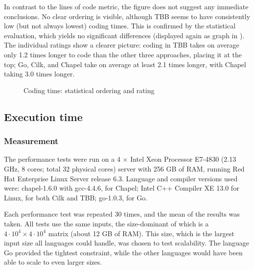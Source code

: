 In contrast to the lines of code metric, the figure does not suggest any immediate conclusions. No clear ordering is visible, although TBB seems to have consistently low (but not always lowest) coding times. This is confirmed by the statistical evaluation, which yields no significant differences (displayed again as graph in ). The individual ratings show a clearer picture: coding in TBB takes on average only 1.2 times longer to code than the other three approaches, placing it at the top; Go, Cilk, and Chapel take on average at least 2.1 times longer, with Chapel taking 3.0 times longer. 

\begin{figure}[htbp]
  \centering
  \vspace{-2ex}
  \caption{Coding time: statistical ordering and rating}
  \label{fig:ord:codingtime}
\end{figure}

\subsection{Execution time}
\label{sec:execution-time}

\subsubsection{Measurement} The performance tests were run on a 4 $\times$ Intel Xeon Processor E7-4830 (2.13 GHz, 8 cores; total 32 physical cores) server with 256 GB of RAM, running Red Hat Enterprise Linux Server release 6.3. Language and compiler versions used were: chapel-1.6.0 with gcc-4.4.6, for Chapel; Intel C++ Compiler XE 13.0 for Linux, for both Cilk and TBB; go-1.0.3, for Go.

Each performance test was repeated 30 times, and the mean of the results was taken. All tests use the same inputs, the size-dominant of which is a $4 \cdot 10^4 \times 4 \cdot 10^4$ matrix (about 12 GB of RAM). This size, which is the largest input size all languages could handle, was chosen to test scalability. The language Go provided the tightest constraint, while the other languages would have been able to scale to even larger sizes. 

